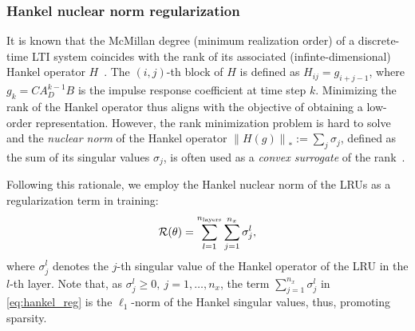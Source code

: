 \documentclass{article} %
\newcommand{\norm}[1]{\left\lVert#1\right\rVert}
\newcommand{\range}[2]{{#1},\ldots, {#2}}
\newcommand{\hinf}{\mathcal{H}_{\infty}}
\newcommand{\regfun}{\mathcal{R}}
\newcommand{\nx}{{n_x}}
\newcommand{\nlayers}{{n_{\rm layers}}}
\begin{document}
\subsubsection{Hankel nuclear norm regularization}


It is known that the  McMillan degree (minimum realization order)
of a discrete-time LTI system  coincides with the rank 
of its associated (infinte-dimensional) Hankel operator $H$~\cite{katayama05}. The $(i,j)$-th block of $H$ is  defined as $H_{ij} = g_{i+j-1}$, where $g_k= CA_{D}^{k-1}B$ is the impulse
response coefficient at time step $k$. Minimizing the rank of the Hankel operator thus aligns with the objective of obtaining a low-order representation. However, the rank minimization problem is hard to solve and  the \emph{nuclear norm} of the Hankel operator $\norm{H(g)}_{*} := \sum_{j} \sigma_j$, defined as the sum of its singular values $\sigma_j$, is often  used as a \emph{convex surrogate} of the rank~\cite{fazel2001, pillonetto2016}. 

  


Following this rationale, we employ the Hankel nuclear norm of the LRUs as a regularization term in training:
\begin{equation}
    \label{eq:hankel_reg}
    \regfun(\theta) = \sum_{l=1}^{\nlayers} \sum_{j=1}^{\nx} \sigma_j^l,
\end{equation}
where $\sigma_j^l$ denotes the $j$-th singular value of the Hankel operator of the LRU in the $l$-th layer. Note that, as $\sigma^{l}_j \geq 0,\  j = \range{1}{\nx}$, the term $\sum_{j=1}^{\nx} \sigma_j^l$ in \eqref{eq:hankel_reg} is the $\ell_1$-norm of the Hankel singular values, thus, promoting sparsity.  
\end{document}
